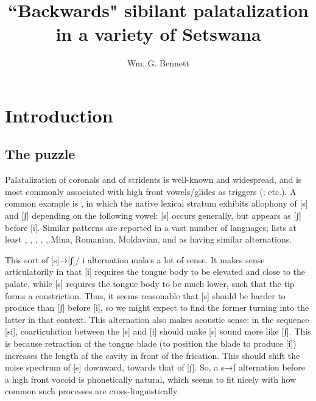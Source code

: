 \documentclass[output=paper,newtxmath,modfonts,nonflat,hidelinks]{langsci/langscibook}
\author{Wm. G. Bennett\affiliation{University of Calgary and Rhodes University}}
\title{``Backwards" sibilant palatalization in a variety of Setswana}
\begin{document}
\maketitle
\section{Introduction}\label{sec:bennett:1}
\subsection{The puzzle}\label{sec:bennett:1.1}



Palatalization of coronals and of stridents is well-known and widespread, and is most commonly associated with high front vowels/glides as triggers (\citealt{Bateman:2007aa,Bateman2010,Kochetov2011}; etc.). A common example is , in which the native lexical stratum exhibits allophony of [s] and [ʃ] depending on the following vowel: [s] occurs generally, but appears as [ʃ] before [i]. Similar patterns are reported in a vast number of languages; \citet{Bateman:2007aa} lists at least , , ,  , , Mina, Romanian, Moldavian, and  as having similar alternations. 

This sort of [s]→[ʃ]/ {\longrule} i alternation makes a lot of sense. It makes sense articulatorily in that [i] requires the tongue body to be elevated and close to the palate, while [s] requires the tongue body to be much lower, such that the tip forms a constriction. Thus, it seems reasonable that [s] should be harder to produce than [ʃ] before [i], so we might expect to find the former turning into the latter in that context. This alternation also makes acoustic sense: in the sequence [si], coarticulation between the [s] and [i] should make [s] sound more like [ʃ]. This is because retraction of the tongue blade (to position the blade to produce [i]) increases the length of the cavity in front of the frication. This should shift the noise spectrum of [s] downward, towards that of [ʃ]. So, a s→ʃ alternation before a high front vocoid is phonetically natural, which seems to fit nicely with how common such processes are cross-linguistically.
\end{document}
